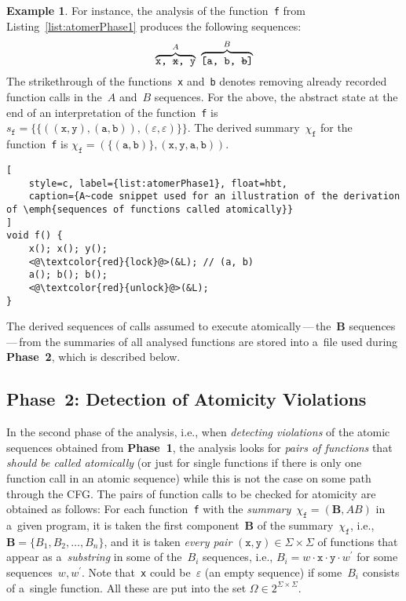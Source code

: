 \documentclass{ExcelAtFIT}
\theoremstyle{definition}
\newtheorem{example}{Example}[section]
\def\uv#1{\iflanguage{british}{``#1''}{\quotedblbase #1\textquotedblleft}}
\begin{document}
\begin{example}
    For instance, the analysis of the function~\texttt{f} from Listing~\ref{list:atomerPhase1} produces the following sequences:
    $$
        \overbrace{\text{\texttt{x,~\sout{x},~y}}}^A~\overbrace{\text{\texttt{[a,~b,~\sout{b}]}}}^B
    $$
    The strikethrough of the functions~\texttt{x} and~\texttt{b} denotes removing already recorded function calls in the~$ A $ and~$ B $ sequences. For the above, the abstract state at the end of an interpretation of the function~\texttt{f} is $ s_\mathtt{f} = \{\{((\mathtt{x, y}), (\mathtt{a, b})), (\varepsilon, \varepsilon)\}\} $. The derived summary~$ \chi_\mathtt{f} $ for the function~\texttt{f} is $ \chi_\mathtt{f} = {(\{{(\mathtt{a, b})}\}, {(\mathtt{x, y, a, b})})} $.
\end{example}

\begin{lstlisting}[
    style=c, label={list:atomerPhase1}, float=hbt,
    caption={A~code snippet used for an illustration of the derivation of \emph{sequences of functions called atomically}}
]
void f() {
    x(); x(); y();
    <@\textcolor{red}{lock}@>(&L); // (a, b)
    a(); b(); b();
    <@\textcolor{red}{unlock}@>(&L);
}
\end{lstlisting}

The derived sequences of calls assumed to execute atomically\,---\,the~$ \boldsymbol{B} $ sequences\,---\,from the summaries of all analysed functions are stored into a~file used during \textbf{Phase~2}, which is described below.

\subsection{\hspace{-.35em}Phase~2: Detection of Atomicity Violations}

In the second phase of the analysis, i.e., when \emph{detecting violations} of the atomic sequences obtained from \textbf{Phase~1}, the analysis looks for \emph{pairs of functions} that \emph{should be called atomically} (or just for single functions if there is only one function call in an atomic sequence) while this is not the case on some path through the CFG. The pairs of function calls to be checked for atomicity are obtained as follows: For each function~\texttt{f} with the \emph{summary}~$ \chi_\mathtt{f} = {(\boldsymbol{B}, AB)} $ in a~given program, it is taken the first component~$ \boldsymbol{B} $ of the summary~$ \chi_\mathtt{f} $, i.e., $ \boldsymbol{B} = {\{B_1, B_2, \ldots, B_n\}} $, and it is taken \emph{every pair} $ {(\mathtt{x}, \mathtt{y})} \in \Sigma \times \Sigma $ of functions that appear as a~\emph{substring} in some of the~$ B_i $ sequences, i.e., $ B_i = w \cdot \mathtt{x} \cdot \mathtt{y} \cdot w^\prime $ for some sequences~$ w, w^\prime $. Note that~\texttt{x} could be~$ \varepsilon $ (an empty sequence) if some~$ B_i $ consists of a~single function. All these \uv{atomic pairs} are put into the set $ \Omega \in 2^{\Sigma \times \Sigma} $.
\end{document}
